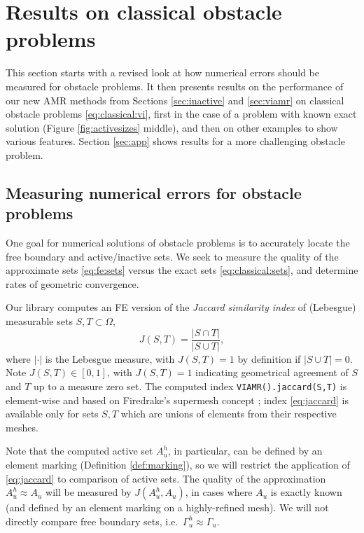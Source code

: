 \documentclass[]{interact}
\theoremstyle{plain}%
\theoremstyle{definition}
\theoremstyle{remark}
\begin{document}
\section{Results on classical obstacle problems} \label{sec:results}

This section starts with a revised look at how numerical errors should be measured for obstacle problems.  It then presents results on the performance of our new AMR methods from Sections \ref{sec:inactive} and \ref{sec:viamr} on classical obstacle problems \eqref{eq:classical:vi}, first in the case of a problem with known exact solution (Figure \ref{fig:activesizes} middle), and then on other examples to show various features.  Section \ref{sec:app} shows results for a more challenging obstacle problem.

\subsection{Measuring numerical errors for obstacle problems} \label{subsec:measures}  One goal for numerical solutions of obstacle problems is to accurately locate the free boundary and active/inactive sets.  We seek to measure the quality of the approximate sets \eqref{eq:fe:sets} versus the exact sets \eqref{eq:classical:sets}, and determine rates of geometric convergence.

Our library computes an FE version of the \emph{Jaccard similarity index} of (Lebesgue) measurable sets $S,T \subset \Omega$,
\begin{equation}
J(S,T) = \frac{|S \cap T|}{|S \cup T|}, \label{eq:jaccard}
\end{equation}
where $|\cdot|$ is the Lebesgue measure, with $J(S,T)=1$ by definition if $|S \cup T|=0$.  Note $J(S,T) \in [0, 1]$, with $J(S,T)=1$ indicating geometrical agreement of $S$ and $T$ up to a measure zero set.  The computed index \texttt{VIAMR().jaccard(S,T)} is element-wise and based on Firedrake's supermesh concept \cite{Farrelletal2009}; index \eqref{eq:jaccard} is available only for sets $S,T$ which are unions of elements from their respective meshes.

Note that the computed active set $A_u^h$, in particular, can be defined by an element marking (Definition \ref{def:marking}), so we will restrict the application of \eqref{eq:jaccard} to comparison of active sets.  The quality of the approximation $A_u^h \approx A_u$ will be measured by $J(A_u^h,A_u)$, in cases where $A_u$ is exactly known (and defined by an element marking on a highly-refined mesh).  We will not directly compare free boundary sets, i.e.~$\Gamma_u^h \approx \Gamma_u$.
\end{document}
